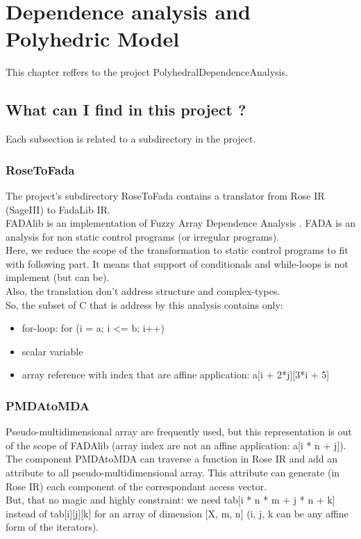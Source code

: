 \chapter{Dependence analysis and Polyhedric Model}

\label{polyhedric:polyhedric}

	This chapter reffers to the project PolyhedralDependenceAnalysis.

	\section{What can I find in this project ?}
	
	Each subsection is related to a subdirectory in the project.
	
		\subsection{RoseToFada}
	
	The project's subdirectory RoseToFada contains a translator from Rose IR (SageIII) to FadaLib IR.\\
	FADAlib \cite{FADAweb} is an implementation of Fuzzy Array Dependence Analysis \cite{FADA}. FADA is an 
analysis for non static control programs (or irregular programs).\\
	Here, we reduce the scope of the transformation to static control programs \cite{Feautrier} to fit with 
following part. It means that support of conditionals and while-loops is not implement (but can be).\\
	Also, the translation don't address structure and complex-types.\\
	
	So, the subset of C that is address by this analysis contains only:
\begin{itemize}
	\item for-loop: for (i = a; i <= b; i++)
	\item scalar variable
	\item array reference with index that are affine application: a[i + 2*j][3*i + 5]
\end{itemize}
	
		\subsection{PMDAtoMDA}
	
	Pseudo-multidimensional array are frequently used, but this representation is out of the scope of FADAlib
(array index are not an affine application: a[i * n + j]).\\
	The component PMDAtoMDA can traverse a function in Rose IR and add an attribute to all pseudo-multidimensional
array. This attribute can generate (in Rose IR) each component of the correspondant access vector.\\
	But, that no magic and highly constraint: we need tab[i * n * m + j * n + k] instead of tab[i][j][k] for an
array of dimension [X, m, n] (i, j, k can be any affine form of the iterators).
	
